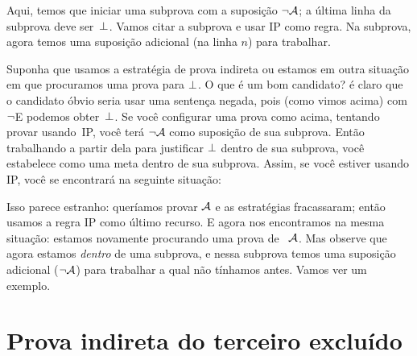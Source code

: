 \begin{fitchproof}
\open
{}
\ellipsesline 
{}
\close
{}
\end{fitchproof}
Aqui, temos que iniciar uma subprova com a suposi\c c\~ao $\neg \mathcal{A}$;
a \'ultima linha da subprova deve ser~$\bot$. Vamos citar a subprova e usar  IP como regra. Na subprova, agora temos uma suposi\c c\~ao adicional (na linha $n$) para trabalhar.

Suponha que usamos a estrat\'egia de prova indireta ou estamos em outra situa\c c\~ao em que procuramos uma prova para  $\bot$.   O que \'e um bom candidato? \'e claro que o candidato \'obvio seria usar uma senten\c ca negada, pois (como vimos acima) com $\neg$E podemos obter~$\bot$. 
 Se voc\^e configurar uma prova como acima, tentando provar  usando~IP, voc\^e ter\'a $\neg \mathcal{A}$ como suposi\c c\~ao de sua subprova. Ent\~ao trabalhando a partir dela para justificar $\bot$ dentro de sua subprova, voc\^e estabelece  como uma meta dentro de sua subprova. Assim, se voc\^e estiver usando  IP, voc\^e se encontrar\'a na seguinte situa\c c\~ao:
\begin{fitchproof}
\open
{}
\ellipsesline
{}
\close
{}
\end{fitchproof} 


Isso parece estranho: quer\'iamos provar $\mathcal{A}$ e as estrat\'egias fracassaram; ent\~ao usamos a regra  IP como \'ultimo recurso. E agora nos encontramos na mesma situa\c c\~ao: estamos novamente procurando uma prova de ~$\mathcal{A}$. Mas observe que agora estamos \emph{dentro} de uma subprova, e nessa subprova temos uma suposi\c c\~ao adicional ($\neg \mathcal{A}$) para trabalhar a qual n\~ao t\'inhamos antes. Vamos ver um exemplo.


\section{Prova indireta do terceiro exclu\'ido}\label{s:proofLEM}

